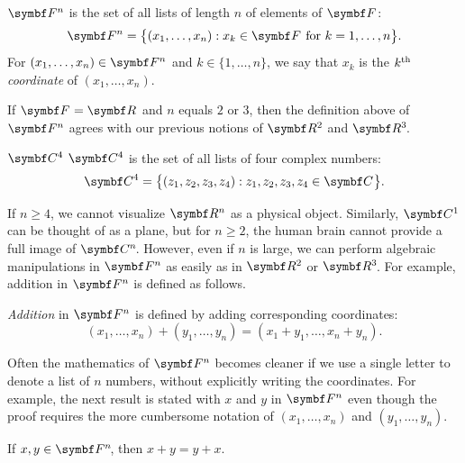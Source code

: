 
{$\F{n}$ is the set of all
lists of length $n$ of elements of $\F{}$:
\[
\F{n} = \br[\big]{(x_1, \dots, x_n): x_k \in\F{} \mbox{\ for\ } k = 1, \dots, n }.
\]
For $(x_1, \dots, x_n) \in \F{n}$ and $k \in \{1, \dots, n\}$, we say
that $x_k$ is the $k^{\text{{th}}}$ \emph{coordinate} of $(x_1, \dots, x_n)$.}

If $\F{} = \R{}$ and $n$ equals $2$ or $3$, then the definition above of $\F{n}$ agrees with our previous notions of $\R{2}$
and $\RR{3}$.

\begin{example}{$\C{4}$}
$\C{4}$ is the set of all lists of four complex numbers:
\[
\C{4} = \br[\big]{ (z_1, z_2, z_3, z_4) : z_1, z_2, z_3, z_4 \in \C{} }.
\]
\exampledisplayend
\end{example}


If $n \ge 4$, we cannot visualize $\R{n}$ as a physical object.  Similarly, $\C{1}$ can be thought of as a
plane, but for \mbox{$n \ge 2$}, the human brain cannot provide a full image of
$\CC{n}$. However, even if $n$ is large, we can perform algebraic manipulations
in $\F{n}$ as easily as in $\R{2}$
or $\RR{3}$.  For example, addition in $\F{n}$ is defined as follows.

{\emph{Addition} in
$\F{n}$ is defined by adding corresponding coordinates:
\[
(x_1, \dots, x_n) + (y_1, \dots, y_n) = (x_1 + y_1, \dots, x_n + y_n).
\]}%

Often the mathematics of $\F{n}$ becomes cleaner if we use a
single letter to denote a list of $n$ numbers, without explicitly
writing the coordinates. For example, the next result is stated with $x$ and $y$ in $\F{n}$ even though the proof requires the more cumbersome notation of $(x_1, \dots, x_n)$ and $(y_1, \dots, y_n)$.

{If $x, y \in \FF{n}$, then $x + y = y + x$.}

